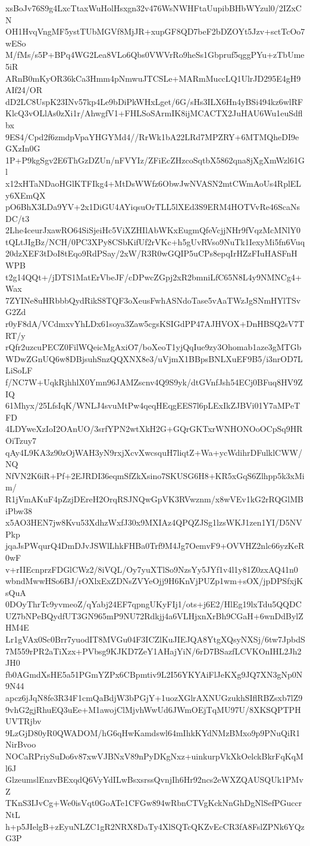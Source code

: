 xsBoJv76S9g4LxcTtaxWuHolHsxgn32v476WsNWHFtaUupibBHbWYzul0/2IZxCN
OH1HvqVngMF5ystTUbMGVf8MjJR+xupGF8QD7beF2bDZOYt5Jzv+sctTcOo7wESo
M/fMs/s5P+BPq4WG2Lea8VLo6Qbs0VWVrRo9heSs1Gbpruf5qggPYu+zTbUme5iR
ARnB0mKyOR36kCa3Hmm4pNmwuJTCSLe+MARmMuccLQ1UlrJD295E4gH9AIf24/OR
dD2LC8UspK23INv57kp4Le9bDiPkWHxLget/6G/sHs3ILX6Hn4yBSi494kz6wlRF
KlcQ3vOLlAs0zXi1r/AhwgfV1+FHLSoSArmIK8ijMCACTX2JuHAU6Wu1euSdflbx
9ES4/Cpd2f6zmdpVpaYHGYMd4//RrWk1bA22LRd7MPZRY+6MTMQheDI9eGXzIn0G
1P+P9kgSgv2E6ThGzDZUn/nFVYIz/ZFiEcZHzcoSqtbX5862qna8jXgXmWzl61Gl
x12xHTaNDaoHGlKTFIkg4+MtDsWWfz6ObwJwNVASN2mtCWmAoUs4RplELy6XEmQX
pO6BhX3LDa9YV+2x1DiGU4AYiqsuOrTLL5lXEd3S9ERM4HOTVvRe46ScaNsDC/t3
2Lhe4ceurJxawRO64SiSjeiHc5ViXZHIlAbWKxEugmQfeVcjjNHr9fVqzMcMNlY0
tQLtJIgBz/NCH/0PC3XPy8CSbKifUf2rVKc+h5gUvRVso9NuTk1IexyMi5fn6Vuq
20dzXEF3tDoI8tEqo9RdPSay/2xW/R3R0wGQIP5uCPs8epqIrHZzFIuHASFnHWPB
t2g14QQt+/jDTS1MatErVbeJF/cDPwcZGpj2xR2bmniLfC65N8L4y9NMNCg4+Wax
7ZYINe8uHRbbbQydRikS8TQF3oXeusFwhASNdoTase5vAaTWzJgSNmHYlTSvG2Zd
r0yF8dA/VCdmxvYhLDx61soya3Zaw5cgsKSIGdPP47AJHVOX+DnHBSQ2sV7TRT/y
rQfr2uzcuPECZ0FilWQeicMgAxiO7/boXeoT1yjQqIue9zy3Ohomab1aze3gMTGb
WDwZGnUQ6w8DBjsuhSnzQQXNX8e3/uVjmX1BBpsBNLXuEF9B5/i3nrOD7LLiSoLF
f/NC7W+UqkRjhhlX0Ymn96JAMZscnv4Q9S9yk/dtGVnfJsh54ECj0BFuq8HV9ZIQ
61Mhyx/25LfsIqK/WNLJ4svuMtPw4qeqHEqgEES7l6pLExIkZJBVi01Y7aMPeTFD
4LDYweXzIoI2OAnUO/3srfYPN2wtXkH2G+GQrGKTxrWNHONOoOCpSq9HROiTzuy7
qAy4L9KA3z90zOjWAH3yN9rxjXcvXwcsquH7liqtZ+Wa+ycWdihrDFulklCWW/NQ
NfVN2K6iR+Pf+2EJRDI36eqmSfZkXsino7SKUSG6H8+KR5xGqS6Zlhpp5k3xMim/
R1jVmAKuF4pZzjDEreH2OrqRSJNQwGpVK3RVwznm/x8wVEv1kG2rRQGlMBiPbw38
x5AO3HEN7jw8Kvu53XdhzWxfJ30x9MXIAz4QPQZJSg1lzsWKJ1zen1YI/D5NVPkp
jqaJsPWqurQ4DmDJvJSWlLhkFHBa0Trf9M4Jg7OemvF9+OVVHZ2nlc66yzKeR0wF
v+rIIEcnprzFDGlCWz2/8iVQL/Oy7yuXTlSo9NzsYy5JYf1v4l1y81Z0zxAQ41n0
wbndMwwHSo6BJ/rOXlxExZDNsZVYeOjj9H6KnVjPUZp1wm+sOX/jpDPSfxjKsQuA
0DOyThrTc9yvmeoZ/qYabj24EF7qpngUKyFIj1/ots+j6E2/HlEg19lxTdu5QQDC
UZ7bNPeBQydfUT3GN965mP9NU72Rdkjj4a6VLHjxnXrBh9CGaH+6wnDdBylZHM4E
Lr1gVAx0Sc0Brr7yuodIT8MVGu04F3ICZlKuJIEJQA8YtgXQsyNXSj/6tw7JpbdS
7M559rPR2aTiXzx+PVbsg9KJKD7ZeY1AHajYiN/6rD7BSazfLCVKOnIHL2Jh2JH0
fb0AGmdXsHE5a51PGmYZPx6CBpmtiv9L2I56YKYAiFlJeKXg9JQ7XN3gNp0N9N44
apcz6jJqN8fe3R34F1cmQaBdjW3bPGjY+1uozXGlrAXNUGzukhSIflRBZsxb7lZ9
9vhG2gjRhuEQ3uEe+M1awojClMjvhWwUd6JWmOEjTqMU97U/8XKSQPTPHUVTRjbv
9LzGjD80yR0QWADOM/hG6qHwKamdswl64mIhkKYdNMzBMxo9p9PNuQiR1NirBvoo
NOCaRPriySuDo6v87xwVJBNxV89nPyDKgNxz+uinkurpVkXkOelckBkrFqKqMl6J
GlzeumslEnzvBExqdQ6VyYdILwBsxsrssQvnjIh6Hr92ncs2eWXZQAUSQUk1PMvZ
TKnS3IJvCg+We0isVqt0GoATe1CFGw894wRbnCTVgKckNnGhDgNlSefPGuccrNtL
h+p5JIelgB+zEyuNLZC1gR2NRX8DaTy4XlSQTcQKZvEcCR3fA8FslZPNk6YQzG3P
